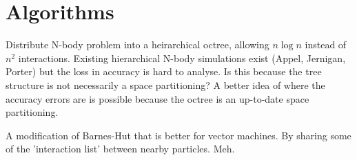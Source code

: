 \section{Algorithms}


Distribute N-body problem into a heirarchical octree, allowing $n \log n$ instead of $n^2$ interactions.
Existing hierarchical N-body simulations exist (Appel, Jernigan, Porter) but the loss in accuracy is hard to analyse. Is this because the tree structure is not necessarily a space partitioning?
A better idea of where the accuracy errors are is possible because the octree is an up-to-date space partitioning.

A modification of Barnes-Hut that is better for vector machines. By sharing some of the 'interaction list' between nearby particles.
Meh.



